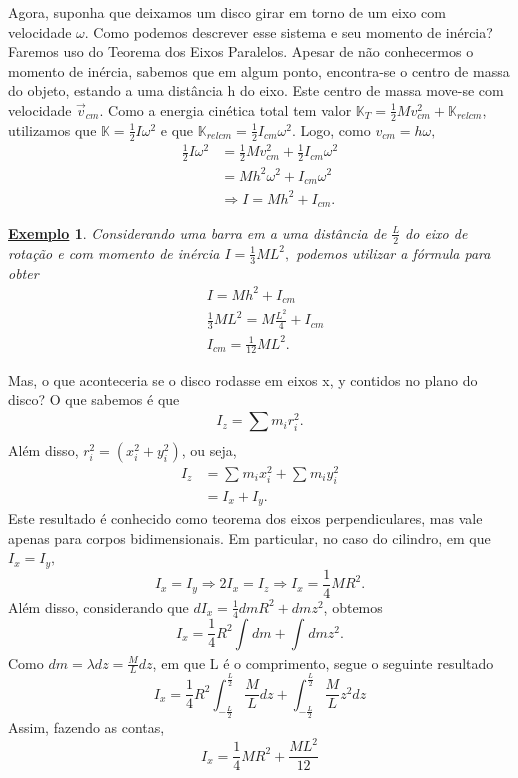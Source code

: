 \documentclass{article}
\newtheorem{example}{\underline{Exemplo}}
\begin{document}
Agora, suponha que deixamos um disco girar em torno de um eixo com velocidade \(\omega \). Como podemos descrever esse sistema e seu momento de inércia? 
Faremos uso do Teorema dos Eixos Paralelos. Apesar de não conhecermos o momento de inércia, sabemos que em algum ponto, encontra-se o centro
de massa do objeto, estando a uma distância h do eixo. Este centro de massa move-se com velocidade \(\vec{v}_{cm}\). Como a energia cinética total
tem valor \(\mathbb{K}_{T} = \frac{1}{2}Mv_{cm}^{2} + \mathbb{K}_{relcm}\), utilizamos que \(\mathbb{K} = \frac{1}{2}I\omega^{2}\) e que \(\mathbb{K}_{relcm}=\frac{1}{2}I_{cm}\omega ^{2}\).
Logo, como \(v_{cm} = h\omega ,\)
\begin{align*}
  \frac{1}{2}I\omega^{2} &= \frac{1}{2} Mv_{cm}^{2} + \frac{1}{2}I_{cm}\omega^{2}\\
                         &= Mh^{2}\omega^{2} + I_{cm}\omega ^{2}\\
                         &\Rightarrow I = Mh^{2} + I_{cm}.
\end{align*}
\begin{example}
  Considerando uma barra em a uma distância de \(\frac{L}{2}\) do eixo de rotação e com momento de inércia 
  \(I = \frac{1}{3}ML^{2},\) podemos utilizar a fórmula para obter 
  \begin{align*}
   &I = Mh^{2} + I_{cm}\\
   &\frac{1}{3}ML^{2} = M \frac{L^{2}}{4} + I_{cm}\\
   &I_{cm} = \frac{1}{12}ML^{2}.
  \end{align*}
\end{example}
Mas, o que aconteceria se o disco rodasse em eixos x, y contidos no plano do disco? O que sabemos é que 
\[
  I_{z} = \sum\limits_{}^{}m_{i}r_{i}^{2}.
\]
Além disso, \(r_{i}^{2} = (x_{i}^{2} + y_{i}^{2})\), ou seja, 
\begin{align*}
  I_{z} &= \sum\limits_{}^{}m_{i}x_{i}^{2} + \sum\limits_{}^{}m_{i}y_{i}^{2}\\
        &= I_{x} + I_{y}.
\end{align*}
Este resultado é conhecido como teorema dos eixos perpendiculares, mas vale apenas para corpos bidimensionais.
Em particular, no caso do cilindro, em que \(I_{x} = I_{y},\) 
\[
  I_{x} = I_{y} \Rightarrow 2I_{x} = I_{z} \Rightarrow I_{x} = \frac{1}{4}MR^{2}.
\]
Além disso, considerando que \(dI_{x} = \frac{1}{4}dm R^{2} + dm z^{2}\), obtemos 
\[
  I_{x} = \frac{1}{4}R^{2} \int_{}^{}dm + \int_{}^{}dm z^{2}.
\]
Como \(dm = \lambda dz = \frac{M}{L}dz\), em que L é o comprimento, segue o seguinte resultado 
\[
  I_{x} = \frac{1}{4}R^{2}\int_{-\frac{L}{2}}^{\frac{L}{2}}\frac{M}{L}dz + \int_{-\frac{L}{2}}^{\frac{L}{2}}\frac{M}{L}z^{2}dz
\]
Assim, fazendo as contas, 
\[
  I_{x} = \frac{1}{4}MR^{2} + \frac{ML^{2}}{12}
\]
\end{document}

